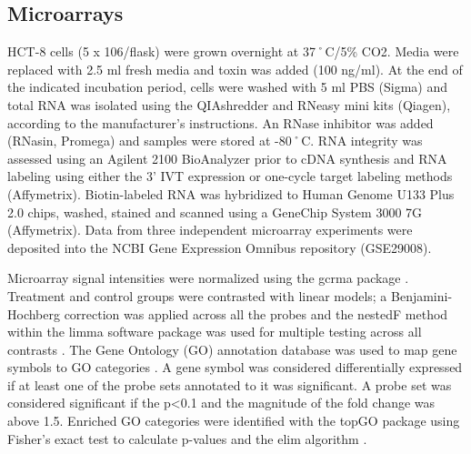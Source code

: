 \subsection{Microarrays}
HCT-8 cells (5 x 106/flask) were grown overnight at 37˚C/5\% CO2.  Media were replaced with 2.5 ml fresh media and  toxin was added (100 ng/ml). At the end of the indicated incubation period, cells were washed with 5 ml PBS (Sigma) and total RNA was isolated using the QIAshredder and RNeasy mini kits (Qiagen), according to the manufacturer’s instructions. An RNase inhibitor was added (RNasin, Promega) and samples were stored at -80˚C. RNA integrity was assessed using an Agilent 2100 BioAnalyzer prior to cDNA synthesis and RNA labeling using either the 3’ IVT expression or one-cycle target labeling methods (Affymetrix). Biotin-labeled RNA was hybridized to Human Genome U133 Plus 2.0 chips, washed, stained and scanned using a GeneChip System 3000 7G (Affymetrix). Data from three independent microarray experiments were deposited into the NCBI Gene Expression Omnibus repository (GSE29008).

Microarray signal intensities were normalized using the gcrma package \cite{Wu:2004ha}. Treatment and control groups were contrasted with linear models; a Benjamini-Hochberg correction was applied across all the probes and the nestedF method within the limma software package was used for multiple testing across all contrasts \cite{Smyth:2004gh,Smyth:2005ht}. The Gene Ontology (GO) annotation database was used to map gene symbols to GO categories \cite{Barrell:2009br}. A gene symbol was considered differentially expressed if at least one of the probe sets annotated to it was significant. A probe set was considered significant if the p<0.1 and the magnitude of the fold change was above 1.5. Enriched GO categories were identified with the topGO package using Fisher’s exact test to calculate p-values and the elim algorithm \cite{Alexa:2006hg}.

